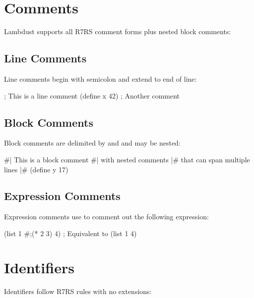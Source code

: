\section{Comments}
\label{sec:comments}

Lambdust supports all R7RS comment forms plus nested block comments:

\subsection{Line Comments}
\label{subsec:line-comments}

Line comments begin with semicolon and extend to end of line:
\begin{lambdustcode}
; This is a line comment
(define x 42) ; Another comment
\end{lambdustcode}

\subsection{Block Comments}  
\label{subsec:block-comments}

Block comments are delimited by \code{\#|} and \code{|\#} and may be nested:
\begin{lambdustcode}
#| This is a block comment
   #| with nested comments |#
   that can span multiple lines |#
(define y 17)
\end{lambdustcode}

\subsection{Expression Comments}
\label{subsec:expr-comments}

Expression comments use \code{\#;} to comment out the following expression:
\begin{lambdustcode}
(list 1 #;(* 2 3) 4)  ; Equivalent to (list 1 4)
\end{lambdustcode}

\section{Identifiers}
\label{sec:identifiers}

Identifiers follow R7RS rules with no extensions:

